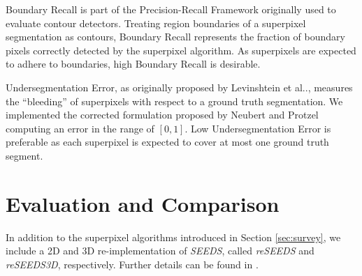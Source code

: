 \documentclass[runningheads]{llncs}
\makeatletter
\DeclareRobustCommand\onedot{\futurelet\@let@token\@onedot}
\def\@onedot{\ifx\@let@token.\else.\null\fi\xspace}
\def\etal{{et al}\onedot}
\makeatother
\begin{document}
    Boundary Recall is part of the Precision-Recall Framework \cite{MartinFowlkesMalik:2004} originally used to evaluate contour detectors. Treating region boundaries of a superpixel segmentation as contours, Boundary Recall represents the fraction of boundary pixels correctly detected by the superpixel algorithm. As superpixels are expected to adhere to boundaries, high Boundary Recall is desirable.
    
    Undersegmentation Error, as originally proposed by Levinshtein \etal \cite{LevinshteinStereKutulakosFleetDickinsonSiddiqi:2009}, measures the ``bleeding'' of superpixels with respect to a ground truth segmentation.
    We implemented the corrected formulation proposed by Neubert and Protzel \cite{NeubertProtzel:2012} computing an error in the range of $[0,1]$. Low Undersegmentation Error is preferable as each superpixel is expected to cover at most one ground truth segment.
    
    \vspace{-1mm}
    \section{Evaluation and Comparison}
    \vspace{-0.5mm}
    \label{sec:evaluation}
    
    In addition to the superpixel algorithms introduced in Section \ref{sec:survey}, we include a 2D and 3D re-implementation of \textit{SEEDS}, called \textit{reSEEDS} and \textit{reSEEDS3D}, respectively. Further details can be found in \cite{Stutz:2014}.
    
\end{document}
